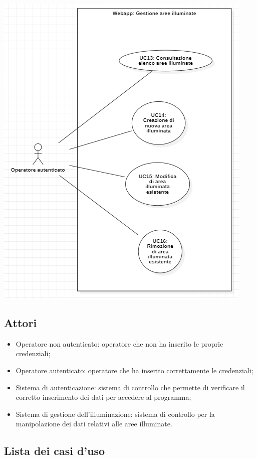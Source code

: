 \documentclass[a4paper, 12pt]{article}
\begin{document}
\includegraphics[scale=0.7]{diagramma_use_case_4.png}

\subsection{Attori}
\begin{itemize}
    \item Operatore non autenticato: operatore che non ha inserito le proprie credenziali;
    \item Operatore autenticato: operatore che ha inserito correttamente le credenziali;
    \item Sistema di autenticazione: sistema di controllo che permette di verificare il corretto inserimento dei dati per accedere al programma;
    \item Sistema di gestione dell'illuminazione: sistema di controllo per la
    manipolazione dei dati relativi alle aree illuminate.
\end{itemize}

\subsection{Lista dei casi d'uso}
\end{document}
